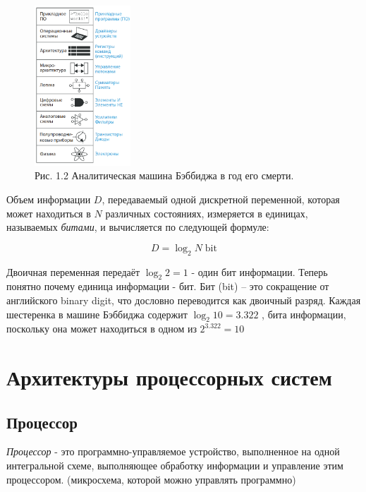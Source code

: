     \begin{figure}[h]
    	\centering
    	\includegraphics[height=6cm]{img/1.1} 
    	\captionsetup{font=footnotesize} 
    	\caption*{Рис. 1.2 Аналитическая машина Бэббиджа в год его смерти.} 
    \end{figure}
    
    \par Объем информации \(D\), передаваемый одной дискретной переменной, которая может находиться в \(N\) различных состояниях, измеряется в единицах, называемых \textit{битами}, и вычисляется по следующей формуле:
    
    \begin{equation}
    	D = \log_2 N \; \text{bit}
    \end{equation}
    
    \par Двоичная переменная передаёт \(\log_2 2 = 1\) - один бит информации. Теперь понятно почему единица информации - бит. Бит (bit) – это сокращение от английского binary digit, что дословно переводится как двоичный разряд. Каждая шестеренка в машине Бэббиджа содержит \(\log_2 10 = 3.322\) , бита информации, поскольку она может находиться в одном из \(2^{3.322} = 10\)
	
	\section{Архитектуры процессорных систем}
	
	\subsection{Процессор}
	
	\par \textit{Процессор} - это программно-управляемое устройство, выполненное на одной интегральной схеме, выполняющее обработку информации и управление этим процессором. (микросхема, которой можно управлять программно)
	
